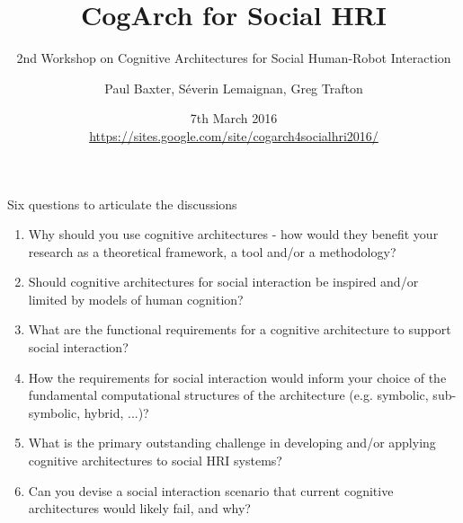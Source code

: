\documentclass[compress]{beamer}
\title{CogArch for Social HRI}
\subtitle{2nd Workshop on Cognitive Architectures for Social Human-Robot
Interaction}
\date{7th March 2016\\ {\tiny \url{https://sites.google.com/site/cogarch4socialhri2016/}}}
\author{\scriptsize Paul Baxter, Séverin Lemaignan, Greg Trafton}
\institute{\texttt{[image: plymouth-logo]}}
\begin{document}

\maketitle



\begin{frame}{Six questions to articulate the discussions}

    \begin{enumerate}

\item<1-> Why should you use cognitive architectures - how would they benefit your
    research as a theoretical framework, a tool and/or a methodology?

\item<2-> Should cognitive architectures for social interaction be inspired and/or
    limited by models of human cognition?

\item<3-> What are the functional requirements for a cognitive architecture to
    support social interaction?

\item<4-> How the requirements for social interaction would inform your choice of
    the fundamental computational structures of the architecture (e.g. symbolic,
    sub-symbolic, hybrid, ...)?

\item<5-> What is the primary outstanding challenge in developing and/or applying
    cognitive architectures to social HRI systems?

\item<6-> Can you devise a social interaction scenario that current cognitive
    architectures would likely fail, and why?

    \end{enumerate}
\end{frame}
\end{document}
